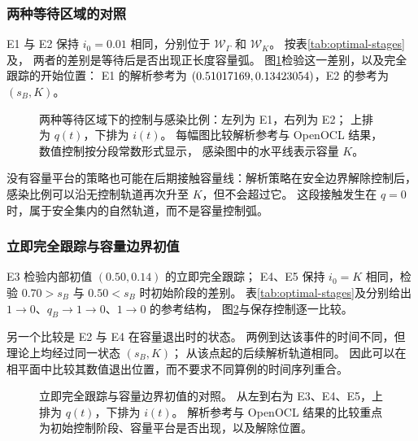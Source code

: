 \documentclass[11pt,a4paper,UTF8]{ctexart}
\theoremstyle{definition}
\begin{document}
\subsubsection{两种等待区域的对照}

E1 与 E2 保持 $i_0=0.01$ 相同，分别位于 $\mathcal W_\Gamma$ 和 $\mathcal W_K$。
按表\ref{tab:optimal-stages}及，
两者的差别是等待后是否出现正长度容量弧。
图\ref{fig:numerical-waiting}检验这一差别，以及完全跟踪的开始位置：
E1 的解析参考为 $(0.51017169,0.13423054)$，E2 的参考为 $(s_B,K)$。

\begin{figure}[H]
\centering
{}
\caption{两种等待区域下的控制与感染比例：左列为 E1，右列为 E2；
上排为 $q(t)$，下排为 $i(t)$。
每幅图比较解析参考与 OpenOCL 结果，数值控制按分段常数形式显示，
感染图中的水平线表示容量 $K$。}
\label{fig:numerical-waiting}
\end{figure}

\NumFindingParagraph{\NumFindingWaiting}

没有容量平台的策略也可能在后期接触容量线：解析策略在安全边界解除控制后，感染比例可以沿无控制轨道再次升至 $K$，但不会超过它。
这段接触发生在 $q=0$ 时，属于安全集内的自然轨道，而不是容量控制弧。

\subsubsection{立即完全跟踪与容量边界初值}

E3 检验内部初值 $(0.50,0.14)$ 的立即完全跟踪；
E4、E5 保持 $i_0=K$ 相同，检验 $0.70>s_B$ 与 $0.50<s_B$ 时初始阶段的差别。
表\ref{tab:optimal-stages}及分别给出
$1\to0$、$q_B\to1\to0$、$1\to0$ 的参考结构，
图\ref{fig:numerical-boundary-tracking}与保存控制逐一比较。

另一个比较是 E2 与 E4 在容量退出时的状态。
两例到达该事件的时间不同，但理论上均经过同一状态 $(s_B,K)$；
从该点起的后续解析轨道相同。
因此可以在相平面中比较其数值退出位置，而不要求不同算例的时间序列重合。

\begin{figure}[H]
\centering
{}
\caption{立即完全跟踪与容量边界初值的对照。
从左到右为 E3、E4、E5，上排为 $q(t)$，下排为 $i(t)$。
解析参考与 OpenOCL 结果的比较重点为初始控制阶段、容量平台是否出现，以及解除位置。}
\label{fig:numerical-boundary-tracking}
\end{figure}
\end{document}
